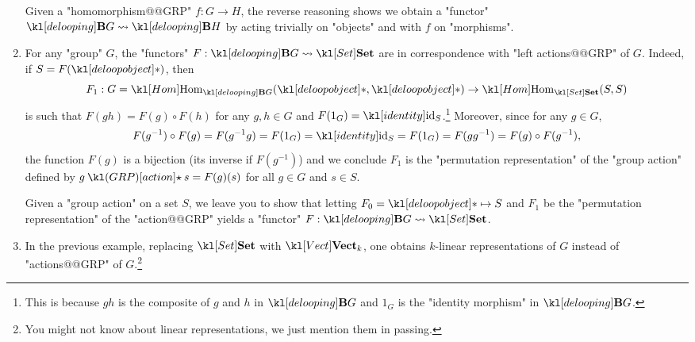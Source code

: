 \documentclass[main.tex]{subfiles}
\begin{document}
\begin{exmps}
\begin{enumerate}
		Given a "homomorphism@@GRP" $f: G \rightarrow H$, the reverse reasoning shows we obtain a "functor" $\deloop{G} \rightsquigarrow \deloop{H}$ by acting trivially on "objects" and with $f$ on "morphisms".
		
		\item\label{exmp:functorgrpaction} For any "group" $G$, the "functors" $F:\deloop{G} \rightsquigarrow \catSet$ are in correspondence with "left actions@@GRP" of $G$. Indeed, if $S = F(\deloopobject)$, then \[F_1: G = \Hom_{\deloop{G}}(\deloopobject, \deloopobject) \rightarrow \Hom_{\catSet}(S, S)\]
		is such that $F(gh) = F(g) \circ F(h)$ for any $g,h \in G$ and $F(1_G) = \id_S$.\footnote{This is because $gh$ is the composite of $g$ and $h$ in $\deloop{G}$ and $1_G$ is the "identity morphism" in $\deloop{G}$.} Moreover, since for any $g \in G$,
		\[ F(g^{-1}) \circ F(g) = F(g^{-1}g) = F(1_G) = \id_S = F(1_G) = F(gg^{-1}) = F(g) \circ F(g^{-1}),\]
		the function $F(g)$ is a bijection (its inverse if $F(g^{-1})$) and we conclude $F_1$ is the "permutation representation" of the "group action" defined by $g \act s = F(g)(s)$ for all $g \in G$ and $s \in S$.

		Given a "group action" on a set $S$, we leave you to show that letting $F_0 = \deloopobject \mapsto S$ and $F_1$ be the "permutation representation" of the "action@@GRP" yields a "functor" $F:\deloop{G} \rightsquigarrow \catSet$.
		
		\item In the previous example, replacing $\catSet$ with $\catVect{k}$, one obtains $k$-linear representations of $G$ instead of "actions@@GRP" of $G$.\footnote{You might not know about linear representations, we just mention them in passing.}
	\end{enumerate}
\end{exmps}
\end{document}
